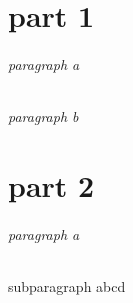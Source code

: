 \documentclass{article}
\begin{document}
\tableofcontents
\part{part 1}
\paragraph{paragraph a}
\paragraph{paragraph b}
\part{part 2}
\paragraph{paragraph a}
\subparagraph{subparagraph abcd}
\end{document}
